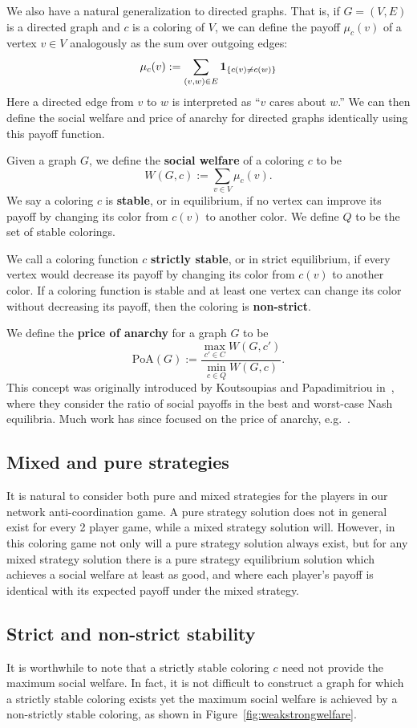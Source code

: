 We also have a natural generalization to directed graphs.  That is, if $G =
(V,E)$ is a directed graph and $c$ is a coloring of $V$, we can define the
payoff $\mu_c(v)$ of a vertex $v \in V$ analogously as the sum over outgoing
edges:
\[ 
   \mu_c(v) := \sum_{(v,w) \in E} \textbf{1}_{\left \{ c(v) \neq c(w) \right \}}
\]
Here a directed edge from $v$ to $w$ is interpreted as ``$v$ cares about $w$.''
We can then define the social welfare and price of anarchy for directed graphs
identically using this payoff function. 

Given a graph $G$, we define the \textbf{social welfare} of a coloring $c$ to
be
\[
   W(G,c) := \sum_{v \in V} \mu_c(v).
\]
We say a coloring $c$ is \textbf{stable}, or in {equilibrium}, if no vertex can
improve its payoff by changing its color from $c(v)$ to another color. We
define $Q$ to be the set of stable colorings.

We call a coloring function $c$ \textbf{strictly stable}, or in {strict
equilibrium}, if every vertex would decrease its payoff by changing its color
from $c(v)$ to another color. If a coloring function is stable and at least one
vertex can change its color without decreasing its payoff, then the coloring is
\textbf{non-strict}.


We define the \textbf{price of anarchy} for a graph $G$ to be
\[
\mbox{PoA}(G) := \frac{\max_{c' \in C}W(G,c')}
{\min_{c \in Q}W(G,c)}.
\]
This concept was originally introduced by Koutsoupias and Papadimitriou
in~\cite{KP99}, where they consider the ratio of social payoffs in the best and
worst-case Nash equilibria. Much work has since focused on the price of
anarchy, e.g.~\cite{FKKMS02,RT02}.

\subsection{Mixed and pure strategies}

It is natural to consider both pure and mixed strategies for the players in our
network anti-coordination game.  A pure strategy solution does not in general
exist for every 2 player game, while a mixed strategy solution will.  However,
in this coloring game not only will a pure strategy solution always exist, but
for any mixed strategy solution there is a pure strategy equilibrium solution
which achieves a social welfare at least as good, and where each player's
payoff is identical with its expected payoff under the mixed strategy.

\subsection{Strict and non-strict stability}
It is worthwhile to note that a strictly stable coloring $c$ need not provide
the maximum social welfare.  In fact, it is not difficult to construct a graph
for which a strictly stable coloring exists yet the maximum social welfare is
achieved by a non-strictly stable coloring, as shown in
Figure~\ref{fig:weakstrongwelfare}. 

